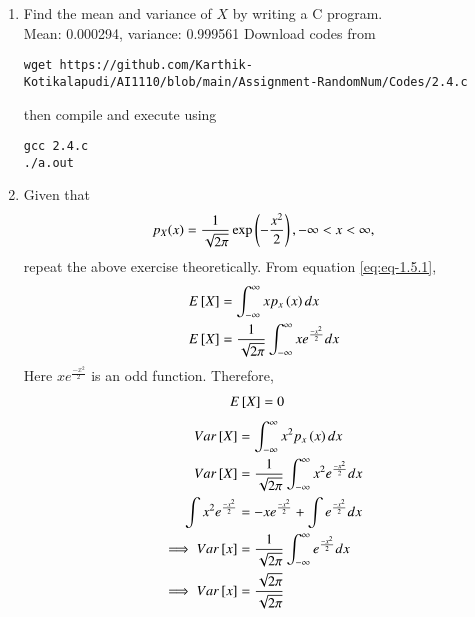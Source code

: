\documentclass[journal,12pt,twocolumn]{IEEEtran}
\renewcommand\thesection{\arabic{section}}
\begin{document}
\begin{enumerate}[label=\thesection.\arabic*
,ref=\thesection.\theenumi]
\item Find the mean and variance of $X$ by writing a C program.
\\
\solution 
Mean: 0.000294, variance: 0.999561
Download codes from
\begin{lstlisting}
wget https://github.com/Karthik-Kotikalapudi/AI1110/blob/main/Assignment-RandomNum/Codes/2.4.c
\end{lstlisting}
then compile and execute using
\begin{lstlisting}
gcc 2.4.c
./a.out
\end{lstlisting}
\item Given that 
\begin{align}
p_{X}(x) = \frac{1}{\sqrt{2\pi}}\exp\left(-\frac{x^2}{2}\right), -\infty < x < \infty,
\end{align}
repeat the above exercise theoretically.
\solution
From equation \eqref{eq:eq-1.5.1},
\begin{align}
	E{}\left[X\right] &= \int^{\infty}_{-\infty}xp_x\left(x\right)dx
	\\
	E{}\left[X\right] &= \frac{1}{\sqrt{2\pi}}\int^{\infty}_{-\infty}xe^{\frac{-x^2}{2}}dx
\end{align}
Here $xe^{\frac{-x^2}{2}}$ is an odd function. Therefore,
\begin{align}
	E{}\left[X\right] &= 0
\end{align}
\begin{align}
	Var{}\left[X\right] &= \int^{\infty}_{-\infty}x^2p_x\left(x\right)dx
	\\
	Var{}\left[X\right] &= \frac{1}{\sqrt{2\pi}}\int^{\infty}_{-\infty}x^2e^{\frac{-x^2}{2}}dx
	\\
	\int x^2e^{\frac{-x^2}{2}} &= -xe^{\frac{-x^2}{2}}+\int e^{\frac{-x^2}{2}}dx
	\\
	\implies Var{}\left[x\right] &= \frac{1}{\sqrt{2\pi}}\int^{\infty}_{-\infty}e^{\frac{-x^2}{2}}dx
	\\
	\implies Var{}\left[x\right] &= \frac{\sqrt{2\pi}}{\sqrt{2\pi}}
\end{align}
\end{enumerate}
\end{document}
